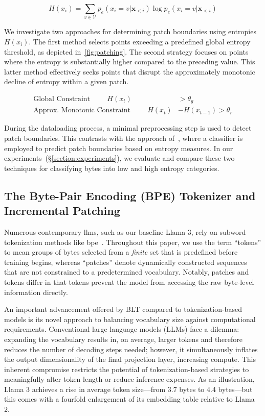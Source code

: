 \begin{equation}
H(x_i) = \sum_{v \in \mathcal{V}} p_{e}(x_i=v|\pmb{x}_{<i}) \log p_{e}(x_i=v|\pmb{x}_{<i})
\end{equation}

We investigate two approaches for determining patch boundaries using entropies $H(x_i)$. The first method selects points exceeding a predefined global entropy threshold, as depicted in~\autoref{fig:patching}. The second strategy focuses on points where the entropy is substantially higher compared to the preceding value. This latter method effectively seeks points that disrupt the approximately monotonic decline of entropy within a given patch.

\begin{align*}
    \text{Global Constraint}\hspace{1cm}H(x_t)& > \theta_g\\
    \text{Approx. Monotonic Constraint}\hspace{1cm}H(x_t)& - H(x_{t-1}) > \theta_r
\end{align*}

During the dataloading process, a minimal preprocessing step is used to detect patch boundaries. This contrasts with the approach of~\citet{nawrot-etal-2023-efficient}, where a classifier is employed to predict patch boundaries based on entropy measures. In our experiments~(\S\ref{section:experiments}), we evaluate and compare these two techniques for classifying bytes into low and high entropy categories.

\subsection{The Byte-Pair Encoding (BPE) Tokenizer and Incremental Patching}
\label{section:incremental-patching}
\label{section:bpe-patch}

Numerous contemporary llms, such as our baseline Llama 3, rely on subword tokenization methods like bpe~\citep{gage1994new, sennrich-etal-2016-neural}. Throughout this paper, we use the term ``tokens'' to mean groups of bytes selected from a \textit{finite} set that is predefined before training begins, whereas ``patches'' denote dynamically constructed sequences that are not constrained to a predetermined vocabulary. Notably, patches and tokens differ in that tokens prevent the model from accessing the raw byte-level information directly.

An important advancement offered by {\textsc BLT} compared to tokenization-based models is its novel approach to balancing vocabulary size against computational requirements. Conventional large language models (LLMs) face a dilemma: expanding the vocabulary results in, on average, larger tokens and therefore reduces the number of decoding steps needed; however, it simultaneously inflates the output dimensionality of the final projection layer, increasing compute. This inherent compromise restricts the potential of tokenization-based strategies to meaningfully alter token length or reduce inference expenses. As an illustration, Llama 3 achieves a rise in average token size—from 3.7 bytes to 4.4 bytes—but this comes with a fourfold enlargement of its embedding table relative to Llama 2.

